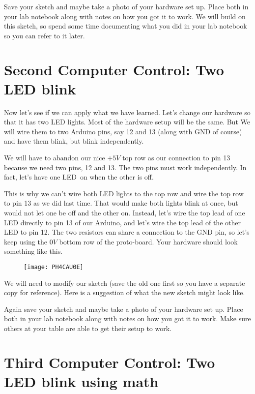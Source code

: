 Save your sketch and maybe take a photo of your hardware set up. Place both in your lab notebook along with notes on how you got it to work. We will build on this sketch, so spend some time documenting what you did in your lab notebook so you can refer to it later.

\section{Second Computer Control: Two LED blink}

Now let's see if we can apply what we have learned. Let's change our hardware so that it has two LED lights. Most of the hardware setup will be the same. But We will wire them to two Arduino pins, say 12 and 13 (along with GND of course) and have them blink, but blink independently.

We will have to abandon our nice $+5\unit{V}$ top row as our connection to pin 13 because we need two pins, 12 and 13. The two pins must work independently. In fact, let's have one LED\ on when the other is off.

This is why we can't wire both LED lights to the top row and wire the top row to pin 13 as we did last time. That would make both lights blink at once, but would not let one be off and the other on. Instead, let's wire the top lead of one LED directly to pin 13 of our Arduino, and let's wire the top lead of the other LED to pin 12. The two resistors can share a connection to the GND pin, so let's keep using the $0\unit{V}$ bottom row of the proto-board. Your hardware should look something like this.

\begin{figure}[h!]
	\centering
	\texttt{[image: PH4CAU0E]}
\end{figure}

We will need to modify our sketch (save the old one first so you have a separate copy for reference). Here is a suggestion of what the new sketch might look like.




Again save your sketch and maybe take a photo of your hardware set up. Place both in your lab notebook along with notes on how you got it to work. Make sure others at your table are able to get their setup to work. 

\section{Third Computer Control: Two LED blink using math}

